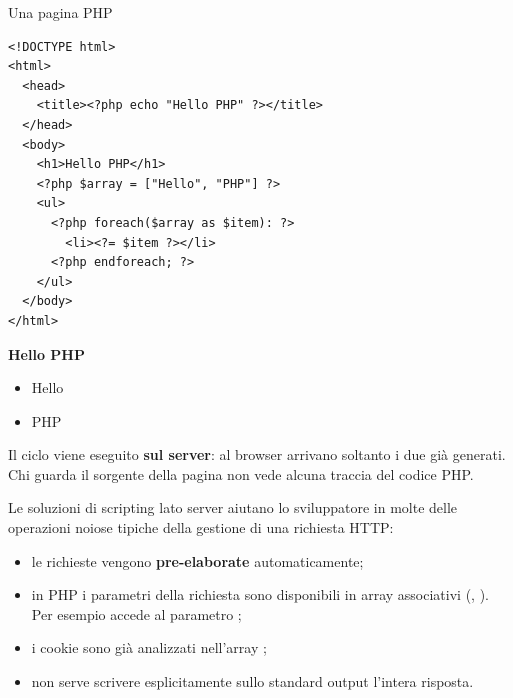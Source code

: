 \begin{esempio}{Una pagina PHP}
\begin{lstlisting}[style=php, name=hello-world.php]
<!DOCTYPE html>
<html>
  <head>
    <title><?php echo "Hello PHP" ?></title>
  </head>
  <body>
    <h1>Hello PHP</h1>
    <?php $array = ["Hello", "PHP"] ?>
    <ul>
      <?php foreach($array as $item): ?>
        <li><?= $item ?></li>
      <?php endforeach; ?>
    </ul>
  </body>
</html>
\end{lstlisting}

\begin{browser}
  {\Lora\bfseries\Huge Hello PHP}\\[6pt]
  \begin{itemize}[leftmargin=1.8em, itemsep=0pt, topsep=2pt, parsep=0pt]
    \item Hello
    \item PHP
  \end{itemize}
\end{browser}

Il ciclo  viene eseguito \textbf{sul server}: al browser arrivano
soltanto i due  già generati. Chi guarda il sorgente della pagina non
vede alcuna traccia del codice PHP.
\end{esempio}

Le soluzioni di scripting lato server aiutano lo sviluppatore in molte delle
operazioni noiose tipiche della gestione di una richiesta HTTP:

\begin{itemize}
  \item le richieste vengono \textbf{pre-elaborate} automaticamente;
  \item in PHP i parametri della richiesta sono disponibili in array
        associativi (, ). Per esempio
         accede al parametro ;
  \item i cookie sono già analizzati nell'array ;
  \item non serve scrivere esplicitamente sullo standard output l'intera
        risposta.
\end{itemize}


